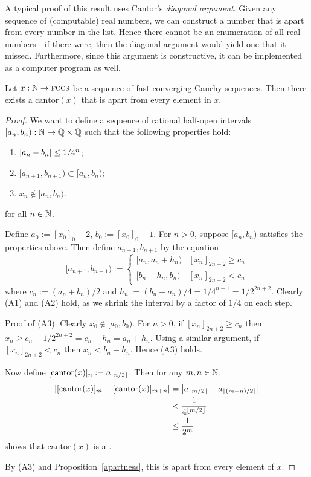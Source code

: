 \documentclass[leqno]{report}
\begin{document}
A typical proof of this result uses Cantor's \textit{diagonal argument}. Given any sequence of (computable) real numbers, we can construct a number that is apart from every number in the list. Hence there cannot be an enumeration of all real numbers---if there were, then the diagonal argument would yield one that it missed. Furthermore, since this argument is constructive, it can be implemented as a computer program as well.

\begin{Proposition}
    Let $x : \mathbb{N} \rightarrow \textsc{fccs}$ be a sequence of fast converging Cauchy sequences. Then there exists a \FCCS{} $\mathrm{cantor}(x)$ that is apart from every element in $x$.
\end{Proposition}

\begin{proof}
    We want to define a sequence of rational half-open intervals $[a_n, b_n) : \mathbb{N} \rightarrow \mathbb{Q} \times \mathbb{Q}$ such that the following properties hold:
    \begin{enumerate}[label=(A\arabic*)]
        \item $\left| a_n - b_n \right| \leq 1/4^n$;
        \item $[a_{n+1}, b_{n+1}) \subset [a_n, b_n)$;
        \item $x_n \notin [a_n, b_n)$.
    \end{enumerate}
    for all $n \in \mathbb{N}$.

    Define $a_0 := [x_0]_0 - 2$, $b_0 := [x_0]_0 - 1$.
    For $n > 0$, suppose $[a_n, b_n)$ satisfies the properties above. Then define $a_{n+1}, b_{n+1}$ by the equation
    \[
        [a_{n+1}, b_{n+1}) := \begin{cases}
            [a_n, a_n + h_n) & [x_n]_{2n+2} \geq c_n \\
            [b_n - h_n, b_n) & [x_n]_{2n+2} < c_n
        \end{cases}
    \]
    where $c_n := (a_n + b_n) / 2$ and $h_n := (b_n - a_n) / 4 = 1/4^{n+1} = 1/2^{2n+2}$. Clearly (A1) and (A2) hold, as we shrink the interval by a factor of $1/4$ on each step.

    Proof of (A3). Clearly $x_0 \notin [a_0, b_0)$. For $n > 0$, if $[x_n]_{2n+2} \geq c_n$ then $x_n \geq c_n - 1/2^{2n+2} = c_n - h_n = a_n + h_n$. Using a similar argument, if $[x_n]_{2n+2} < c_n$ then $x_n < b_n - h_n$. Hence (A3) holds.

    Now define $[\mathrm{cantor}(x)]_n := a_{\lfloor n/2\rfloor}$. Then for any $m, n \in \mathbb{N}$,
    \begin{align*}
        \left| [\mathrm{cantor}(x)]_m - [\mathrm{cantor}(x)]_{m+n} \right|
        &= \left| a_{\lfloor m/2\rfloor} - a_{\lfloor(m+n)/2\rfloor} \right| \\
        &< \frac{1}{4^{\lfloor m/2\rfloor}} \\
        &\leq \frac{1}{2^m}
    \end{align*}
    shows that $\mathrm{cantor}(x)$ is a \FCCS.

    By (A3) and Proposition~\ref{apartness}, this is apart from every element of $x$.
\end{proof}
\end{document}
